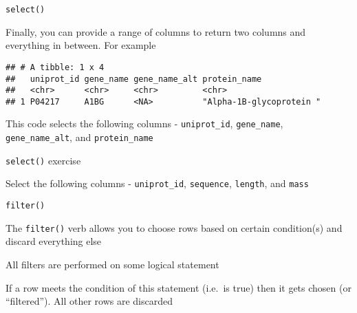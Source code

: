 \documentclass[ignorenonframetext,]{beamer}
\newenvironment{Shaded}{\begin{snugshade}}{\end{snugshade}}
\newcommand{\DecValTok}[1]{\textcolor[rgb]{0.00,0.00,0.81}{#1}}
\newcommand{\KeywordTok}[1]{\textcolor[rgb]{0.13,0.29,0.53}{\textbf{#1}}}
\newcommand{\NormalTok}[1]{#1}
\newcommand{\OperatorTok}[1]{\textcolor[rgb]{0.81,0.36,0.00}{\textbf{#1}}}
\newcommand{\StringTok}[1]{\textcolor[rgb]{0.31,0.60,0.02}{#1}}
\begin{document}
\begin{frame}[fragile]{\texttt{select()}}
\protect\hypertarget{select-2}{}

Finally, you can provide a range of columns to return two columns and
everything in between. For example

\begin{Shaded}
\end{Shaded}

\begin{verbatim}
## # A tibble: 1 x 4
##   uniprot_id gene_name gene_name_alt protein_name            
##   <chr>      <chr>     <chr>         <chr>                   
## 1 P04217     A1BG      <NA>          "Alpha-1B-glycoprotein "
\end{verbatim}

This code selects the following columns - \texttt{uniprot\_id},
\texttt{gene\_name}, \texttt{gene\_name\_alt}, and
\texttt{protein\_name}

\end{frame}

\begin{frame}[fragile]{\texttt{select()} exercise}
\protect\hypertarget{select-exercise}{}

Select the following columns - \texttt{uniprot\_id}, \texttt{sequence},
\texttt{length}, and \texttt{mass}

\begin{Shaded}
\end{Shaded}

\end{frame}

\begin{frame}[fragile]{\texttt{filter()}}
\protect\hypertarget{filter}{}

The \texttt{filter()} verb allows you to choose rows based on certain
condition(s) and discard everything else

All filters are performed on some logical statement

If a row meets the condition of this statement (i.e.~is true) then it
gets chosen (or ``filtered''). All other rows are discarded

\end{frame}
\end{document}
